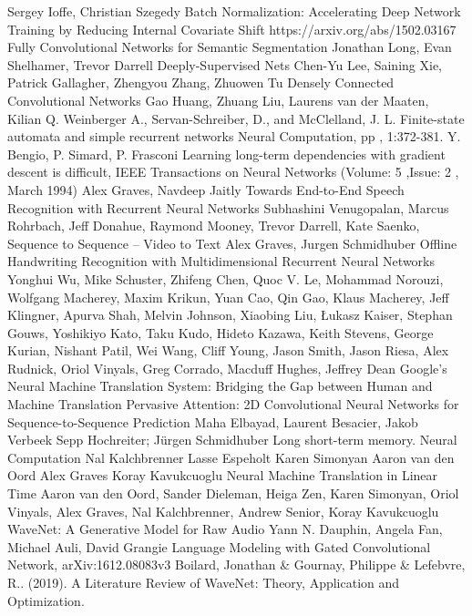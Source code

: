 \documentclass[a4paper,11pt,twoside]{report}
\theoremstyle{definition}
\begin{document}
\begin{thebibliography}{20}
Sergey Ioffe, Christian Szegedy Batch Normalization: Accelerating Deep Network Training by Reducing Internal Covariate Shift https://arxiv.org/abs/1502.03167
Fully Convolutional Networks for Semantic Segmentation Jonathan Long, Evan Shelhamer, Trevor Darrell
Deeply-Supervised Nets Chen-Yu Lee, Saining Xie, Patrick Gallagher, Zhengyou Zhang, Zhuowen Tu
Densely Connected Convolutional Networks Gao Huang, Zhuang Liu, Laurens van der Maaten, Kilian Q. Weinberger
 A., Servan-Schreiber, D., and McClelland, J. L. Finite-state automata and simple recurrent networks Neural Computation, pp , 1:372-381.
 Y. Bengio, P. Simard, P. Frasconi Learning long-term dependencies with gradient descent is difficult, IEEE Transactions on Neural Networks (Volume: 5 ,Issue: 2 , March 1994)
 Alex Graves, Navdeep Jaitly Towards End-to-End Speech Recognition with Recurrent Neural Networks
 Subhashini Venugopalan, Marcus Rohrbach, Jeff Donahue, Raymond Mooney, Trevor Darrell, Kate Saenko,  Sequence to Sequence -- Video to Text
 Alex Graves, Jurgen Schmidhuber Offline Handwriting Recognition with Multidimensional Recurrent Neural Networks
 Yonghui Wu, Mike Schuster, Zhifeng Chen, Quoc V. Le, Mohammad Norouzi, Wolfgang Macherey, Maxim Krikun, Yuan Cao, Qin Gao, Klaus Macherey, Jeff Klingner, Apurva Shah, Melvin Johnson, Xiaobing Liu, Łukasz Kaiser, Stephan Gouws, Yoshikiyo Kato, Taku Kudo, Hideto Kazawa, Keith Stevens, George Kurian, Nishant Patil, Wei Wang, Cliff Young, Jason Smith, Jason Riesa, Alex Rudnick, Oriol Vinyals, Greg Corrado, Macduff Hughes, Jeffrey Dean Google's Neural Machine Translation System: Bridging the Gap between Human and Machine Translation
Pervasive Attention: 2D Convolutional Neural Networks for Sequence-to-Sequence Prediction Maha Elbayad, Laurent Besacier, Jakob Verbeek
 Sepp Hochreiter; Jürgen Schmidhuber Long short-term memory. Neural Computation
 Nal Kalchbrenner  Lasse Espeholt  Karen Simonyan  Aaron van den Oord  Alex Graves  Koray Kavukcuoglu Neural Machine Translation in Linear Time
Aaron van den Oord, Sander Dieleman, Heiga Zen, Karen Simonyan, Oriol Vinyals, Alex Graves, Nal Kalchbrenner, Andrew Senior, Koray Kavukcuoglu WaveNet: A Generative Model for Raw Audio
 Yann N. Dauphin, Angela Fan, Michael Auli, David Grangie Language Modeling with Gated Convolutional Network, arXiv:1612.08083v3
 Boilard, Jonathan \& Gournay, Philippe \& Lefebvre, R.. (2019). A Literature Review of WaveNet: Theory, Application and Optimization. 

\end{thebibliography}
\end{document}
